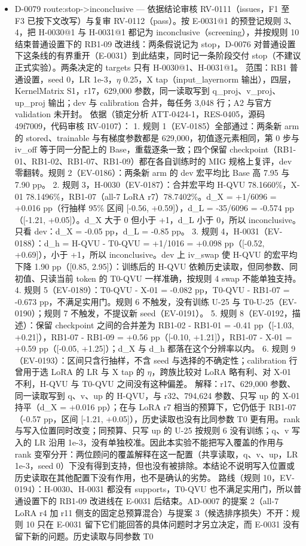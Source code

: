 \documentclass[11pt]{article}
\begin{document}
\begin{itemize}
\item D-0079 route:stop-\textgreater{}inconclusive --- 依据结论审核 RV-0111（issues，F1 至 F3 已按下文改写）与复审 RV-0112（pass）。按 E-0031@1 的预登记规则 3、4，把 H-0030@1 与 H-0031@1 都记为 inconclusive（screening），并按规则 10 结束普通设置下的 RB1-09 改进线：两条假说记为 stop，D-0076 对普通设置下这条线的有界重开（E-0031）到此结束，同时记一条阶段交付 stop（不建议正式实验）。两条决定的 targets 只有 H-0030@1、H-0031@1。 范围：RB1 普通设置，seed 0，LR 1e-3，\ensuremath{\eta} 0.25，X tap（input\_layernorm 输出），四层，KernelMatrix S1，r17，629,000 参数，同一读取写到 q\_proj、v\_proj、up\_proj 输出；dev 与 calibration 合并，每任务 3,048 行；A2 与官方 validation 未开封。 依据（锁定分析 ATT-0424-1，RES-0405，源码 49f7009，代码审核 RV-0107）： 1. 规则 1（EV-0185）全部通过：两条新 arm 的 stored、trainable 与有梯度参数都是 629,000，初值逐元素相同，第 0 步与 iv\_off 等于同一分配上的 Base，重载逐条一致；四个保留 checkpoint（RB1-01、RB1-02、RB1-07、RB1-09）都在各自训练时的 MIG 规格上复评，dev 零翻转。规则 2（EV-0186）：两条新 arm 的 dev 宏平均比 Base 高 7.95 与 7.90 pp。 2. 规则 3，H-0030（EV-0187）：合并宏平均 H-QVU 78.1660\%，X-01 78.1496\%，RB1-07（all-7 LoRA r7）78.7402\%。d\_X = +1/6096 = +0.016 pp（行抽样 95\% 区间 [-0.56, +0.59]），d\_L = -35/6096 = -0.574 pp（[-1.21, +0.05]）。d\_X 大于 0 但小于 +1，d\_L 小于 0，所以 inconclusive。只看 dev：d\_X = -0.05 pp，d\_L = -0.85 pp。 3. 规则 4，H-0031（EV-0188）：d\_h = H-QVU - T0-QVU = +1/1016 = +0.098 pp（[-0.52, +0.69]），小于 +1，所以 inconclusive。dev 上 iv\_swap 使 H-QVU 的宏平均下降 1.90 pp（[0.85, 2.95]）：训练后的 H-QVU 依赖历史读取，但同参数、同初值、只读当前 token 的 T0-QVU 一样准确，按规则 4 swap 不能单独支持。 4. 规则 5（EV-0189）：T0-QVU - X-01 = -0.082 pp，T0-QVU - RB1-07 = -0.673 pp，不满足实用门。规则 6 不触发，没有训练 U-25 与 T0-U-25（EV-0190）；规则 7 不触发，不提议新 seed（EV-0191）。 5. 规则 8（EV-0192，描述）：保留 checkpoint 之间的合并差为 RB1-02 - RB1-01 = -0.41 pp（[-1.03, +0.21]），RB1-07 - RB1-09 = +0.56 pp（[-0.10, +1.21]），RB1-07 - X-01 = +0.59 pp（[-0.05, +1.25]）；d\_X 与 d\_h 都落在这个分辨率以内。 6. 规则 9（EV-0193）：区间只含行抽样，不含 seed 与选择的不确定性；calibration 行曾用于选 LoRA 的 LR 与 X tap 的 \ensuremath{\eta}，跨族比较对 LoRA 略有利、对 X-01 不利，H-QVU 与 T0-QVU 之间没有这种偏差。 解释：r17、629,000 参数、同一读取写到 q、v、up 的 H-QVU，与 r32、794,624 参数、只写 up 的 X-01 持平（d\_X = +0.016 pp）；在与 LoRA r7 相当的预算下，它仍低于 RB1-07（-0.57 pp，区间 [-1.21, +0.05]），历史读取也没有比同参数 T0 更有用。rank 与写入位置同时改变；同预算、只写 up 的 U-25 按规则 6 没有训练；q、v 写入的 LR 沿用 1e-3，没有单独校准。因此本实验不能把写入覆盖的作用与 rank 变窄分开：两位顾问的覆盖解释在这一配置（共享读取，q、v、up，LR 1e-3，seed 0）下没有得到支持，但也没有被排除。本结论不说明写入位置或历史读取在其他配置下没有作用，也不是确认的劣势。 路线（规则 10，EV-0194）：H-0030、H-0031 都没有 supports，T0-QVU 也不满足实用门，所以普通设置下的 RB1-09 改进线在 E-0031 后结束。AD-0007 的提案 2（all-7 LoRA r4 加 r11 侧支的固定总预算混合）与提案 3（候选排序损失）不开：规则 10 只在 E-0031 留下它们能回答的具体问题时才另立决定，而 E-0031 没有留下新的问题。历史读取与同参数 T0 
\end{itemize}
\end{document}
